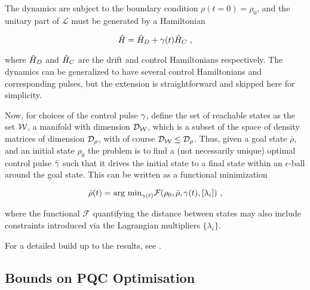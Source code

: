 The dynamics are subject to the boundary condition \(\rho(t=0) = \rho_0\), and
the unitary part of \(\mathcal{L}\) must be generated by a Hamiltonian

\begin{equation}
    \hat{H} = \hat{H}_D + \gamma(t) \hat{H}_C~,
\end{equation}

where \(\hat{H}_D\) and \(\hat{H}_C\) are the drift and control
Hamiltonians respectively. The dynamics can be generalized to have several
control Hamiltonians and corresponding pulses, but the extension is
straightforward and skipped here for simplicity.

Now, for choices of the control pulse \(\gamma\), define the set of
reachable states as the set \(\mathcal{W}\), a manifold with dimension
\(\mathcal{D}_{\mathcal{W}}\), which is a subset of the space of density matrices of
dimension \(\mathcal{D}_\rho\), with of course \(\mathcal{D}_{\mathcal{W}} \leq \mathcal{D}_\rho\).
Thus, given a goal state \(\bar{\rho}\), and an initial state \(\rho_0\) the
problem is to find a (not necessarily unique) optimal control pulse
\(\bar{\gamma}\) such that it drives the initial state to a final state
within an \(\epsilon\)-ball around the goal state. This can be written as a
functional minimization

\begin{equation}
    \bar{\rho}(t) = \text{arg min}_{\gamma(t)} 
    \mathcal{F}(\rho_0, \bar{\rho}, \gamma(t), [\lambda_i])~,
\end{equation}

where the functional \(\mathcal{F}\) quantifying the distance between states may
also include constraints introduced via the Lagrangian multipliers
\(\{\lambda_i\}\).

For a detailed build up to the results, see \cite{lloyd2014information}.

\subsection{Bounds on PQC Optimisation}

